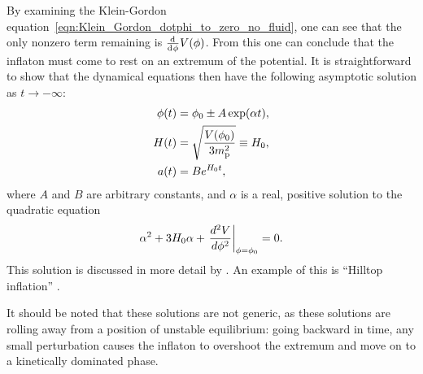 By examining the Klein-Gordon equation~\eqref{eqn:Klein_Gordon_dotphi_to_zero_no_fluid}, one can see that the only nonzero term remaining is $\frac{\operatorname{d}^{}\!{}}{\operatorname{d}^{}\!{\phi}}V(\phi)$. From this one can conclude that the inflaton must come to rest on an extremum of the potential. It is straightforward to show that the dynamical equations then have the following asymptotic solution as $t \to -\infty$:
%
\begin{align}
  \phi(t)
  &=
  \phi_0 \pm A \exp(\alpha t),\\
  H(t)
  &=
  \sqrt{\frac{V(\phi_0)}{3m_{\mathrm{p}}^2}} \equiv H_0,\\
  a(t)
  &=
  B e^{H_0t},
\end{align}
%
where $A$ and $B$  are arbitrary constants, and $\alpha$ is a real, positive solution to the quadratic equation
% 
%
\begin{equation}
  \alpha^2 + 3H_0\alpha + \left.
  \frac{{d^2}V}{{d}\phi^2}\right|_{\phi=\phi_0}=0.
\end{equation}
%
This solution is discussed in more detail by \citet{destri_preinflationary_2010}. An example of this is ``Hilltop inflation'' \citep{linde_1982,albrecht_1982}. 

It should be noted that these solutions are not generic, as these solutions are rolling away from a position of unstable equilibrium: going backward in time, any small perturbation causes the inflaton to overshoot the extremum and move on to a kinetically dominated phase.

